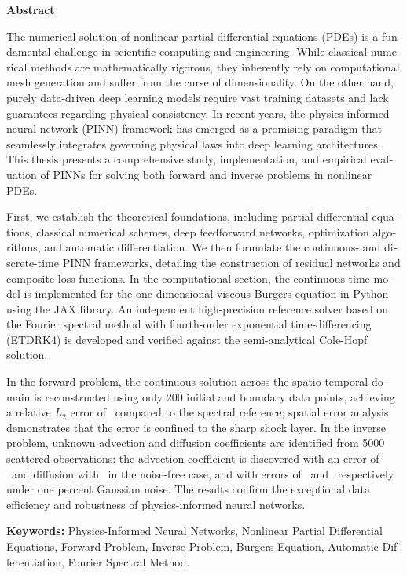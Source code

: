 \clearpage
{}
{}

\begin{singlespace}
\begin{latin}
\begin{center}
{\Large\bfseries Abstract}\\[0.4cm]
\end{center}

The numerical solution of nonlinear partial differential equations (PDEs) is a fundamental challenge in scientific computing and engineering. While classical numerical methods are mathematically rigorous, they inherently rely on computational mesh generation and suffer from the curse of dimensionality. On the other hand, purely data-driven deep learning models require vast training datasets and lack guarantees regarding physical consistency. In recent years, the physics-informed neural network (PINN) framework has emerged as a promising paradigm that seamlessly integrates governing physical laws into deep learning architectures. This thesis presents a comprehensive study, implementation, and empirical evaluation of PINNs for solving both forward and inverse problems in nonlinear PDEs.

First, we establish the theoretical foundations, including partial differential equations, classical numerical schemes, deep feedforward networks, optimization algorithms, and automatic differentiation. We then formulate the continuous- and discrete-time PINN frameworks, detailing the construction of residual networks and composite loss functions. In the computational section, the continuous-time model is implemented for the one-dimensional viscous Burgers equation in Python using the JAX library. An independent high-precision reference solver based on the Fourier spectral method with fourth-order exponential time-differencing (ETDRK4) is developed and verified against the semi-analytical Cole-Hopf solution.

In the forward problem, the continuous solution across the spatio-temporal domain is reconstructed using only 200 initial and boundary data points, achieving a relative $L_2$ error of \FwdRelErr\ compared to the spectral reference; spatial error analysis demonstrates that the error is confined to the sharp shock layer. In the inverse problem, unknown advection and diffusion coefficients are identified from 5000 scattered observations: the advection coefficient is discovered with an error of \LamIErrClean\ and diffusion with \LamIIErrClean\ in the noise-free case, and with errors of \LamIErrNoisy\ and \LamIIErrNoisy\ respectively under one percent Gaussian noise. The results confirm the exceptional data efficiency and robustness of physics-informed neural networks.

\vspace{0.3cm}
\noindent\textbf{Keywords:} Physics-Informed Neural Networks, Nonlinear Partial Differential Equations, Forward Problem, Inverse Problem, Burgers Equation, Automatic Differentiation, Fourier Spectral Method.
\end{latin}
\end{singlespace}
